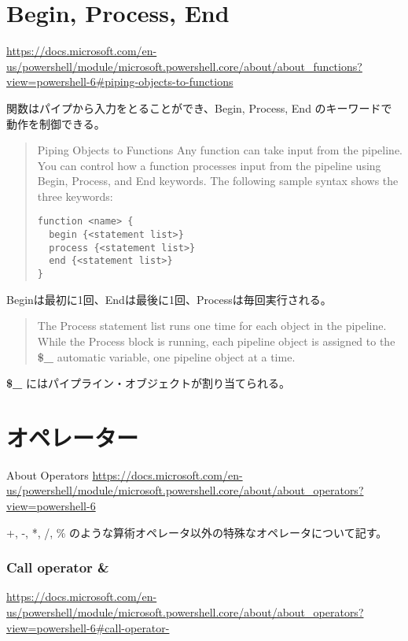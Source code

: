 \documentclass[dvipdfmx]{jsarticle}
\begin{document}
\section{Begin, Process, End}

\url{https://docs.microsoft.com/en-us/powershell/module/microsoft.powershell.core/about/about_functions?view=powershell-6#piping-objects-to-functions}

関数はパイプから入力をとることができ、Begin, Process, End のキーワードで動作を制御できる。
\begin{quote}
Piping Objects to Functions
Any function can take input from the pipeline. You can control how a function processes input from the pipeline using Begin, Process, and End keywords. The following sample syntax shows the three keywords:

\begin{verbatim}
function <name> {
  begin {<statement list>}
  process {<statement list>}
  end {<statement list>}
}
\end{verbatim}

\end{quote}

Beginは最初に1回、Endは最後に1回、Processは毎回実行される。

\begin{quote}
The Process statement list runs one time for each object in the pipeline. While the Process block is running, each pipeline object is assigned to the \textbf{\$\_}  automatic variable, one pipeline object at a time.
\end{quote}

\textbf{\$\_} にはパイプライン・オブジェクトが割り当てられる。


\section{オペレーター}
\begin{flushleft}
About Operators \url{https://docs.microsoft.com/en-us/powershell/module/microsoft.powershell.core/about/about_operators?view=powershell-6}
\end{flushleft}

+, -, *, /, \% のような算術オペレータ以外の特殊なオペレータについて記す。

\subsubsection{Call operator \&}

\url{https://docs.microsoft.com/en-us/powershell/module/microsoft.powershell.core/about/about_operators?view=powershell-6#call-operator-}
\end{document}

